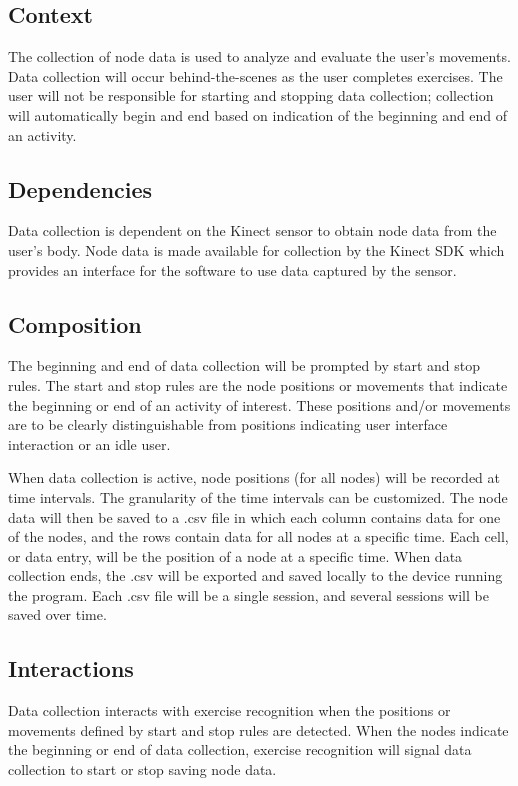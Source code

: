 \documentclass[onecolumn, draftclsnofoot,10pt, compsoc]{IEEEtran}
\begin{document}
\subsection{Context}
The collection of node data is used to analyze and evaluate the user's movements. Data collection will occur behind-the-scenes as the user completes exercises. The user will not be responsible for starting and stopping data collection; collection will automatically begin and end based on indication of the beginning and end of an activity.

\subsection{Dependencies}
Data collection is dependent on the Kinect sensor to obtain node data from the user's body. Node data is made available for collection by the Kinect SDK which provides an interface for the software to use data captured by the sensor.

\subsection{Composition}
The beginning and end of data collection will be prompted by start and stop rules. The start and stop rules are the node positions or movements that indicate the beginning or end of an activity of interest. These positions and/or movements are to be clearly distinguishable from positions indicating user interface interaction or an idle user. 

When data collection is active, node positions (for all nodes) will be recorded at time intervals. The granularity of the time intervals can be customized. The node data will then be saved to a .csv file in which each column contains data for one of the nodes, and the rows contain data for all nodes at a specific time. Each cell, or data entry, will be the position of a node at a specific time. When data collection ends, the .csv will be exported and saved locally to the device running the program. Each .csv file will be a single session, and several sessions will be saved over time.

\subsection{Interactions}
Data collection interacts with exercise recognition when the positions or movements defined by start and stop rules are detected. When the nodes indicate the beginning or end of data collection, exercise recognition will signal data collection to start or stop saving node data.
\end{document}
